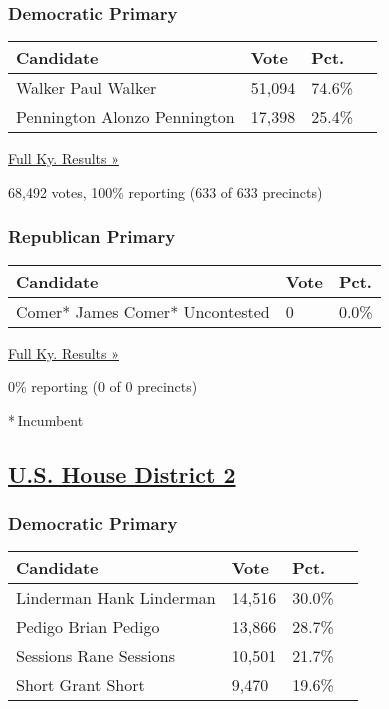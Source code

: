 \hypertarget{democratic-primary}{%
\subsubsection{Democratic Primary}\label{democratic-primary}}

\begin{longtable}[]{@{}llll@{}}
\toprule
Candidate & Vote & Pct. &\tabularnewline
\midrule
\endhead
 Walker Paul Walker & 51,094 & 74.6\% &\tabularnewline
 Pennington Alonzo Pennington & 17,398 & 25.4\% &\tabularnewline
\bottomrule
\end{longtable}

\href{https://www.nytimes3xbfgragh.onion/elections/results/kentucky}{Full
Ky. Results »}

68,492 votes, 100\% reporting (633 of 633 precincts)

\hypertarget{republican-primary}{%
\subsubsection{Republican Primary}\label{republican-primary}}

\begin{longtable}[]{@{}lll@{}}
\toprule
Candidate & Vote & Pct.\tabularnewline
\midrule
\endhead
 Comer* James Comer* Uncontested & 0 & 0.0\%\tabularnewline
\bottomrule
\end{longtable}

\href{https://www.nytimes3xbfgragh.onion/elections/results/kentucky}{Full
Ky. Results »}

0\% reporting (0 of 0 precincts)

* Incumbent

\hypertarget{us-house-district-2}{%
\subsection{\texorpdfstring{\href{https://www.nytimes3xbfgragh.onion/elections/results/kentucky-house-district-2-primary-election}{U.S.
House District 2}}{U.S. House District 2}}\label{us-house-district-2}}

\hypertarget{democratic-primary-1}{%
\subsubsection{Democratic Primary}\label{democratic-primary-1}}

\begin{longtable}[]{@{}llll@{}}
\toprule
Candidate & Vote & Pct. &\tabularnewline
\midrule
\endhead
 Linderman Hank Linderman & 14,516 & 30.0\% &\tabularnewline
 Pedigo Brian Pedigo & 13,866 & 28.7\% &\tabularnewline
 Sessions Rane Sessions & 10,501 & 21.7\% &\tabularnewline
 Short Grant Short & 9,470 & 19.6\% &\tabularnewline
\bottomrule
\end{longtable}

